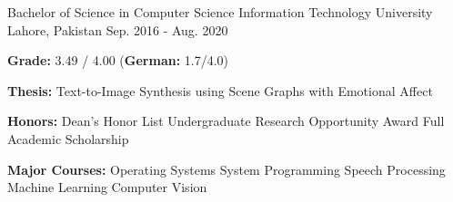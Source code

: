 

\begin{cventries}

  \cventry
    {Bachelor of Science in Computer Science} %
    {Information Technology University} %
    {Lahore, Pakistan} %
    {Sep. 2016 - Aug. 2020} %
    {
      \begin{cvitems} %
        \item \textbf{Grade: }3.49 / 4.00 (\textbf{German: }1.7/4.0)
        \item \textbf{Thesis: }Text-to-Image Synthesis using Scene Graphs with Emotional Affect
        \item \textbf{Honors: } Dean's Honor List \acvSep Undergraduate Research Opportunity Award \acvSep Full Academic Scholarship
        \item \textbf{Major Courses: } Operating Systems \acvSep System Programming \acvSep Speech Processing \acvSep Machine Learning \acvSep Computer Vision 
      \end{cvitems}
    }
    {}

\end{cventries}
